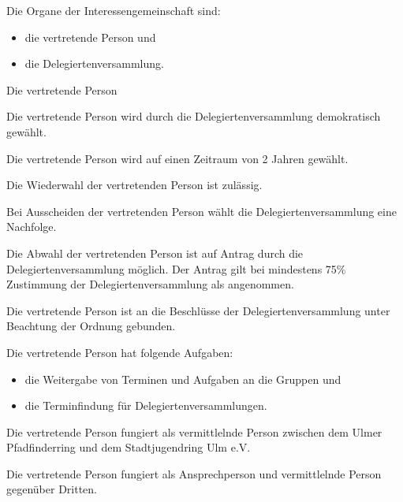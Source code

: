 \begin{legal}
        \begin{legal}
            \item Die Organe der Interessengemeinschaft sind:
                \begin{itemize}
                    \item die vertretende Person und
                    \item die Delegiertenversammlung.
                \end{itemize}
        \end{legal}
    \item Die vertretende Person
        \begin{legal}
            \item Die vertretende Person wird durch die Delegiertenversammlung 
                  demokratisch gewählt.
            \item Die vertretende Person wird auf einen Zeitraum von 2 Jahren gewählt.
            \item Die Wiederwahl der vertretenden Person ist zulässig.
            \item Bei Ausscheiden der vertretenden Person wählt die Delegiertenversammlung 
                  eine Nachfolge.
            \item Die Abwahl der vertretenden Person ist auf Antrag durch die 
                  Delegiertenversammlung möglich. Der Antrag gilt bei mindestens 75\% Zustimmung der
                  Delegiertenversammlung als angenommen.
            \item Die vertretende Person ist an die Beschlüsse der Delegiertenversammlung 
                  unter Beachtung der Ordnung gebunden.
            \item Die vertretende Person hat folgende Aufgaben:
                  \begin{itemize}
                        \item die Weitergabe von Terminen und Aufgaben an die Gruppen und
                        \item die Terminfindung für Delegiertenversammlungen.
                  \end{itemize}
            \item Die vertretende Person fungiert als vermittlelnde Person zwischen dem 
                  Ulmer Pfadfinderring und dem Stadtjugendring Ulm e.V.
            \item Die vertretende Person fungiert als Ansprechperson und vermittlelnde 
                  Person gegenüber Dritten.
        \end{legal}

\end{legal}
